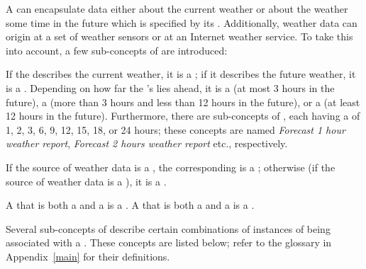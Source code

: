 A  can encapsulate data either about the current weather or about the weather some time in the future which is specified by its . Additionally, weather data can origin at a set of weather sensors or at an Internet weather service. To take this into account, a few sub-concepts of  are introduced:

If the  describes the current weather, it is a ; if it describes the future weather, it is a . Depending on how far the 's  lies ahead, it is a  (at most 3 hours in the future), a  (more than 3 hours and less than 12 hours in the future), or a  (at least 12 hours in the future). Furthermore, there are sub-concepts of , each having a  of 1, 2, 3, 6, 9, 12, 15, 18, or 24 hours; these concepts are named \emph{Forecast 1 hour weather report}, \emph{Forecast 2 hours weather report} etc., respectively.

If the source of weather data is a , the corresponding  is a ; otherwise (if the source of weather data is a ), it is a .

A  that is both a  and a  is a . A  that is both a  and a  is a .

Several sub-concepts of  describe certain combinations of instances of  being associated with a . These concepts are listed below; refer to the glossary in Appendix~\ref{main} for their definitions.

